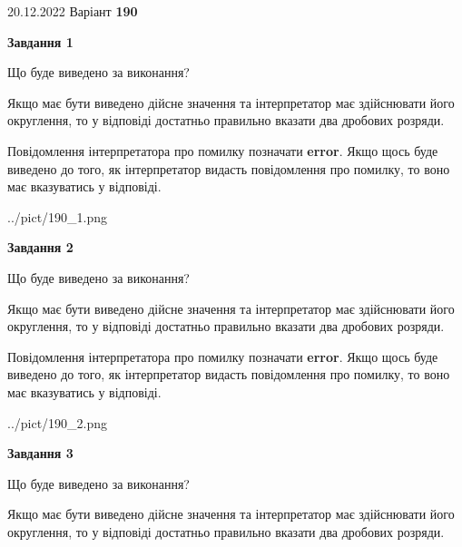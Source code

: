 \documentclass[12pt, ukrainian]{article}
\begin{document}
{20.12.2022 Варіант \No \textbf { 190 }\par}
{
\begin {Large}

{\begin {center}\textbf{Завдання 1}\end {center}}\par
Що буде виведено за виконання? \par

Якщо має бути виведено дійсне значення та інтерпретатор має здійснювати його округлення, 
то у відповіді достатньо правильно вказати два дробових розряди.

Повідомлення інтерпретатора про помилку позначати \textbf{error}.
Якщо щось буде виведено до того, як інтерпретатор видасть повідомлення про помилку, 
то воно має вказуватись у відповіді. \par

\begin{center}
	{../pict/190_1.png}
\end{center}
\newpage

{\begin {center}\textbf{Завдання 2}\end {center}}\par
Що буде виведено за виконання? \par

Якщо має бути виведено дійсне значення та інтерпретатор має здійснювати його округлення, 
то у відповіді достатньо правильно вказати два дробових розряди.

Повідомлення інтерпретатора про помилку позначати \textbf{error}.
Якщо щось буде виведено до того, як інтерпретатор видасть повідомлення про помилку, 
то воно має вказуватись у відповіді. \par

\begin{center}
	{../pict/190_2.png}
\end{center}
\newpage

{\begin {center}\textbf{Завдання 3}\end {center}}\par
Що буде виведено за виконання? \par

Якщо має бути виведено дійсне значення та інтерпретатор має здійснювати його округлення, 
то у відповіді достатньо правильно вказати два дробових розряди.


\end{Large}}
\end{document}
